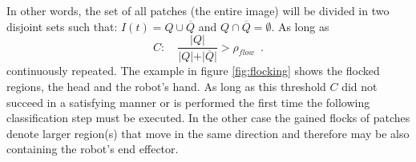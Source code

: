 In other words, the set of all patches (the entire image) will be divided in two disjoint sets such that: $I \left( t\right) = Q \cup \overline{Q}$ and $Q \cap \overline{Q} = \emptyset$.  As long as 
\[
C: \quad \dfrac{\vert Q \vert}{\vert Q \vert + \vert \overline{Q} \vert} > \rho_{flow} \enspace .
\]%
continuously repeated. The example in figure \ref{fig:flocking} shows the flocked regions, the head and the robot's hand. 
As long as this threshold $C$ did not succeed in a satisfying manner or is performed the first time the following classification step must be executed. In the other case the gained flocks of patches denote larger region(s) that move in the same direction and therefore may be also containing the robot's end effector.%
%
\\ \newline
%
